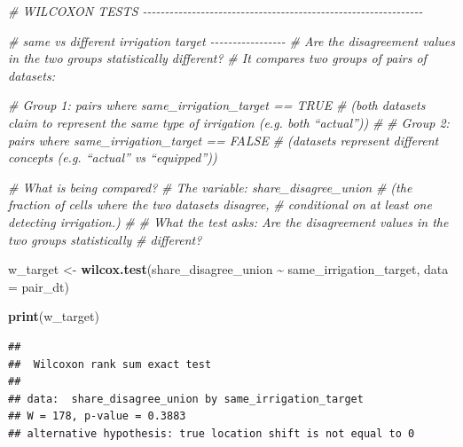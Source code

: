 \documentclass[
  11pt,
]{article}
\newenvironment{Shaded}{\begin{snugshade}}{\end{snugshade}}
\newcommand{\AttributeTok}[1]{\textcolor[rgb]{0.13,0.29,0.53}{#1}}
\newcommand{\CommentTok}[1]{\textcolor[rgb]{0.56,0.35,0.01}{\textit{#1}}}
\newcommand{\FunctionTok}[1]{\textcolor[rgb]{0.13,0.29,0.53}{\textbf{#1}}}
\newcommand{\NormalTok}[1]{#1}
\newcommand{\OtherTok}[1]{\textcolor[rgb]{0.56,0.35,0.01}{#1}}
\newcommand{\SpecialCharTok}[1]{\textcolor[rgb]{0.81,0.36,0.00}{\textbf{#1}}}
\begin{document}
\begin{Shaded}
\begin{Highlighting}[]
\CommentTok{\# WILCOXON TESTS {-}{-}{-}{-}{-}{-}{-}{-}{-}{-}{-}{-}{-}{-}{-}{-}{-}{-}{-}{-}{-}{-}{-}{-}{-}{-}{-}{-}{-}{-}{-}{-}{-}{-}{-}{-}{-}{-}{-}{-}{-}{-}{-}{-}{-}{-}{-}{-}{-}{-}{-}{-}{-}{-}{-}{-}{-}{-}{-}{-}{-}{-}{-}}

\CommentTok{\# same vs different irrigation target {-}{-}{-}{-}{-}{-}{-}{-}{-}{-}{-}{-}{-}{-}{-}{-}{-}}
\CommentTok{\# Are the disagreement values in the two groups statistically different?}
\CommentTok{\# It compares two groups of pairs of datasets:}

\CommentTok{\# Group 1: pairs where same\_irrigation\_target == TRUE}
\CommentTok{\# (both datasets claim to represent the same type of irrigation (e.g. both “actual”))}
\CommentTok{\#}
\CommentTok{\# Group 2: pairs where same\_irrigation\_target == FALSE}
\CommentTok{\# (datasets represent different concepts (e.g. “actual” vs “equipped”))}

\CommentTok{\# What is being compared?}
\CommentTok{\# The variable: share\_disagree\_union}
\CommentTok{\# (the fraction of cells where the two datasets disagree,}
\CommentTok{\# conditional on at least one detecting irrigation.)}
\CommentTok{\#}
\CommentTok{\# What the test asks: Are the disagreement values in the two groups statistically}
\CommentTok{\# different?}

\NormalTok{w\_target }\OtherTok{\textless{}{-}} \FunctionTok{wilcox.test}\NormalTok{(share\_disagree\_union }\SpecialCharTok{\textasciitilde{}}\NormalTok{ same\_irrigation\_target,}
                        \AttributeTok{data =}\NormalTok{ pair\_dt)}

\FunctionTok{print}\NormalTok{(w\_target)}
\end{Highlighting}
\end{Shaded}

\begin{verbatim}
## 
##  Wilcoxon rank sum exact test
## 
## data:  share_disagree_union by same_irrigation_target
## W = 178, p-value = 0.3883
## alternative hypothesis: true location shift is not equal to 0
\end{verbatim}
\end{document}

